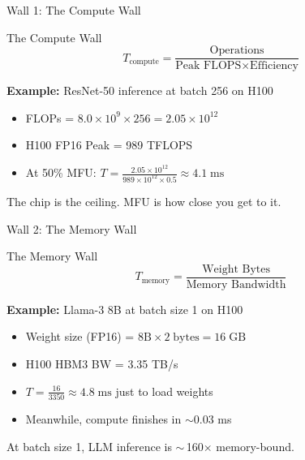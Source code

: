 \documentclass[aspectratio=169, 12pt]{beamer}
\newcommand{\wallbox}[2]{%
  \begin{block}{#1}#2\end{block}%
}
\begin{document}
\begin{frame}[shrink]{Wall 1: The Compute Wall}

\small
\wallbox{The Compute Wall}{
\[
  T_{\text{compute}} = \frac{\text{Operations}}{\text{Peak FLOPS} \times \text{Efficiency}}
\]
}

\vspace{0.2cm}
\textbf{Example:} ResNet-50 inference at batch 256 on H100

\begin{itemize}
  \item FLOPs = $8.0 \times 10^{9} \times 256 = 2.05 \times 10^{12}$
  \item H100 FP16 Peak = 989 TFLOPS
  \item At 50\% MFU: $T = \frac{2.05 \times 10^{12}}{989 \times 10^{12} \times 0.5} \approx 4.1\;\text{ms}$
\end{itemize}

\vspace{0.2cm}
\alert{The chip is the ceiling. MFU is how close you get to it.}
\end{frame}

\begin{frame}[shrink]{Wall 2: The Memory Wall}

\small
\wallbox{The Memory Wall}{
\[
  T_{\text{memory}} = \frac{\text{Weight Bytes}}{\text{Memory Bandwidth}}
\]
}

\vspace{0.2cm}
\textbf{Example:} Llama-3 8B at batch size 1 on H100

\begin{itemize}
  \item Weight size (FP16) = $8\text{B} \times 2\;\text{bytes} = 16\;\text{GB}$
  \item H100 HBM3 BW = 3.35 TB/s
  \item $T = \frac{16}{3350} \approx 4.8\;\text{ms}$ just to load weights
  \item Meanwhile, compute finishes in $\sim$0.03 ms
\end{itemize}

\vspace{0.2cm}
\alert{At batch size 1, LLM inference is $\sim$\,160$\times$ memory-bound.}
\end{frame}
\end{document}
